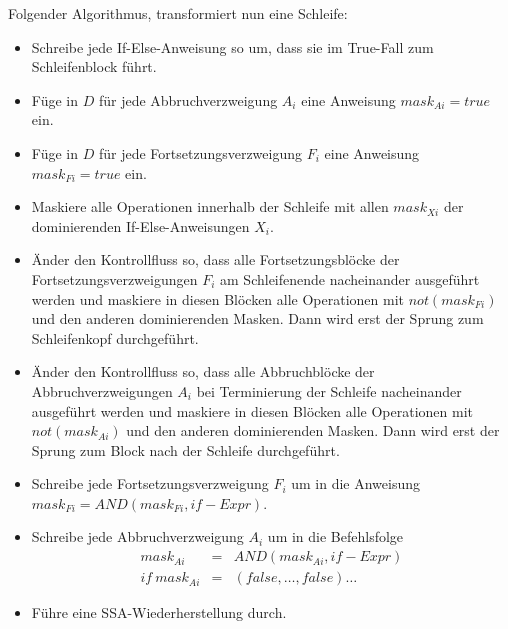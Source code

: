 \documentclass[a4paper,10pt]{article}
\begin{document}
Folgender Algorithmus, transformiert nun eine Schleife:

\begin{itemize}

    \item Schreibe jede If-Else-Anweisung so um, dass sie im True-Fall zum Schleifenblock führt.

    \item Füge in $D$ für jede Abbruchverzweigung $A_i$ eine Anweisung $mask_{Ai} = true$ ein.

    \item Füge in $D$ für jede Fortsetzungsverzweigung $F_i$ eine Anweisung $mask_{Fi} = true$ ein.

    \item Maskiere alle Operationen innerhalb der Schleife mit allen $mask_{Xi}$ der dominierenden
    If-Else-Anweisungen $X_i$.

    \item Änder den Kontrollfluss so, dass alle Fortsetzungsblöcke der Fortsetzungsverzweigungen
    $F_i$ am Schleifenende nacheinander ausgeführt werden und maskiere in diesen Blöcken alle
    Operationen mit $not(mask_{Fi})$ und den anderen dominierenden Masken. Dann wird erst der Sprung zum
    Schleifenkopf durchgeführt.

    \item Änder den Kontrollfluss so, dass alle Abbruchblöcke der Abbruchverzweigungen
    $A_i$ bei Terminierung der Schleife nacheinander ausgeführt werden und maskiere in diesen Blöcken alle
    Operationen mit $not(mask_{Ai})$ und den anderen dominierenden Masken. Dann wird erst der Sprung zum
    Block nach der Schleife durchgeführt.

    \item Schreibe jede Fortsetzungsverzweigung $F_i$ um in die Anweisung $mask_{Fi} = AND(mask_{Fi}, if-Expr)$.

    \item Schreibe jede Abbruchverzweigung $A_i$ um in die Befehlsfolge
    \begin{eqnarray*}
        mask_{Ai} & = & AND(mask_{Ai}, if-Expr) \\
        if\ mask_{Ai} & = & (false, \dots, false) \dots
    \end{eqnarray*}

    \item Führe eine SSA-Wiederherstellung durch.

\end{itemize}
\end{document}
